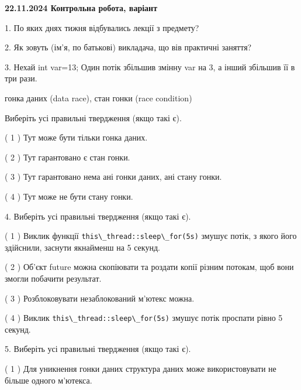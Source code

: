 \documentclass[12pt, ukrainian]{article}
\def\code#1{\Verb!#1!}
\begin{document}
\vspace{4mm}
\newpage
\begin {large}

\textbf{22.11.2024 Контрольна робота, варіант  }\par


{
1. По яких днях тижня відбувались лекції з предмету?



\vspace{5mm}
2. Як зовуть (ім'я, по батькові) викладача, що вів практичні заняття?



\vspace{5mm}
3. Нехай int var=13; Один потік збільшив змінну var на 3, а інший збільшив її в три рази.

гонка даних (data race), стан гонки (race condition)

Виберіть усі правильні твердження (якщо такі є).\par
\vspace{2mm}
( 1 ) Тут може бути тільки гонка даних.%

( 2 ) Тут гарантовано є стан гонки.%

( 3 ) Тут гарантовано нема ані гонки даних, ані стану гонки.%

( 4 ) Тут може не бути стану гонки.%


\vspace{5mm}
4. Виберіть усі правильні твердження (якщо такі є).\par
\vspace{2mm}

( 1 ) Виклик функції \code{this\_thread::sleep\_for(5s)} змушує потік, з якого його здійснили, заснути якнайменш на 5 секунд.%

( 2 ) Об’єкт future можна скопіювати та роздати копії різним потокам, щоб вони змогли побачити результат.%

( 3 ) Розблоковувати незаблокований м’ютекс можна.%

( 4 ) Виклик \code{this\_thread::sleep\_for(5s)} змушує потік проспати рівно 5 секунд.%


\vspace{5mm}
5. Виберіть усі правильні твердження (якщо такі є).\par
\vspace{2mm}

( 1 ) Для уникнення гонки даних структура даних може використовувати не більше одного м’ютекса.%

}
\end{large}
\end{document}
